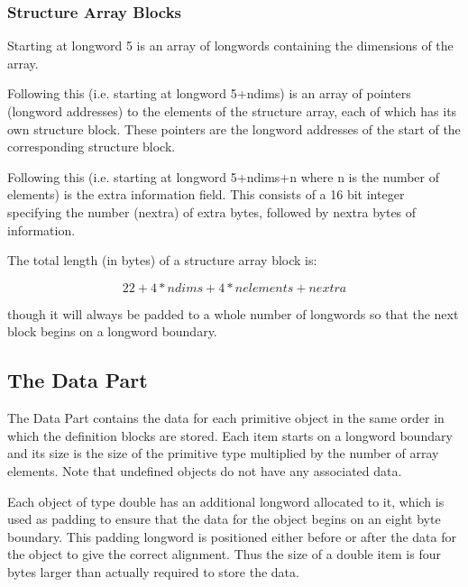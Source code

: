 \subsubsection{Structure Array Blocks}

Starting at longword 5 is an array of longwords containing the dimensions
of the array.

Following this (i.e. starting at longword 5+ndims) is an array of pointers
(longword addresses) to the elements of the structure array, each of which has
its own structure block. These pointers are the longword addresses of the
start of the corresponding structure block.

Following this (i.e. starting at longword 5+ndims+n where n is the number of
elements) is the extra information field. This consists of a 16 bit integer
specifying the number (nextra) of extra bytes, followed by nextra bytes of
information.

The total length (in bytes) of a structure array block is:

\begin{displaymath}
      22 + 4*ndims + 4*nelements + nextra 
\end{displaymath}

though it will always be padded to a whole number of longwords so that the next
block begins on a longword boundary.

\subsection{The Data Part}

The Data Part contains the data for each primitive object in the same order in
which the definition blocks are stored. Each item starts on a longword boundary
and its size is the size of the primitive type multiplied by the number of
array elements. Note that undefined objects do not have any associated data.

Each object of type double has an additional longword allocated to it, which is
used as padding to ensure that the data for the object begins on an eight byte
boundary. This padding longword is positioned either before or after the data
for the object to give the correct alignment. Thus the size of a double item is
four bytes larger than actually required to store the data.



